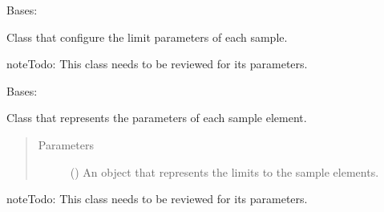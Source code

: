 \documentclass[a4paper,10pt,english]{sphinxmanual}
\begin{document}

\begin{fulllineitems}
\label{\detokenize{autodoc/mrsprint/mrsprint.subject:mrsprint.subject.sample.SampleConfig}}
Bases: 

Class that configure the limit parameters of each sample.

\begin{sphinxadmonition}{note}{\label{autodoc/mrsprint/mrsprint.subject:index-1}Todo:}
This class needs to be reviewed for its parameters.
\end{sphinxadmonition}

\end{fulllineitems}


\begin{fulllineitems}
\label{\detokenize{autodoc/mrsprint/mrsprint.subject:mrsprint.subject.sample.SampleElement}}
Bases: 

Class that represents the parameters of each sample element.
\begin{quote}\begin{description}
\item[{Parameters}] \leavevmode
{} ({\hyperref[\detokenize{autodoc/mrsprint/mrsprint.subject:mrsprint.subject.sample.SampleElementConfig}]{}}) \textendash{} An object that represents the limits to the sample elements.

\end{description}\end{quote}

\begin{sphinxadmonition}{note}{\label{autodoc/mrsprint/mrsprint.subject:index-2}Todo:}
This class needs to be reviewed for its parameters.
\end{sphinxadmonition}

\end{fulllineitems}
\end{document}
